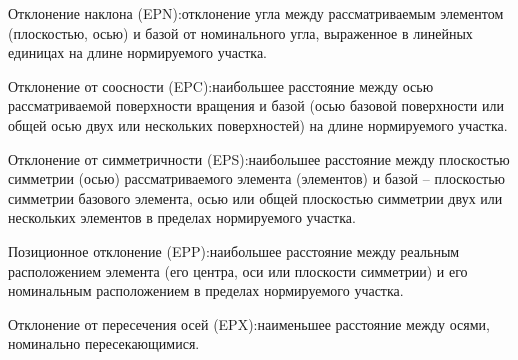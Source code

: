 Отклонение наклона (EPN):отклонение угла между рассматриваемым элементом (плоскостью, осью) и базой от номинального угла, выраженное в линейных единицах на длине нормируемого участка.

Отклонение от соосности (EPC):наибольшее расстояние между осью рассматриваемой поверхности вращения и базой (осью базовой поверхности или общей осью двух или нескольких поверхностей) на длине нормируемого участка.

Отклонение от симметричности (EPS):наибольшее расстояние между плоскостью симметрии (осью) рассматриваемого элемента (элементов) и базой – плоскостью симметрии базового элемента, осью или общей плоскостью симметрии двух или нескольких элементов в пределах нормируемого участка.

Позиционное отклонение (EPP):наибольшее расстояние между реальным расположением элемента (его центра, оси или плоскости симметрии) и его номинальным расположением в пределах нормируемого участка.

Отклонение от пересечения осей (EPX):наименьшее расстояние между осями, номинально пересекающимися.

